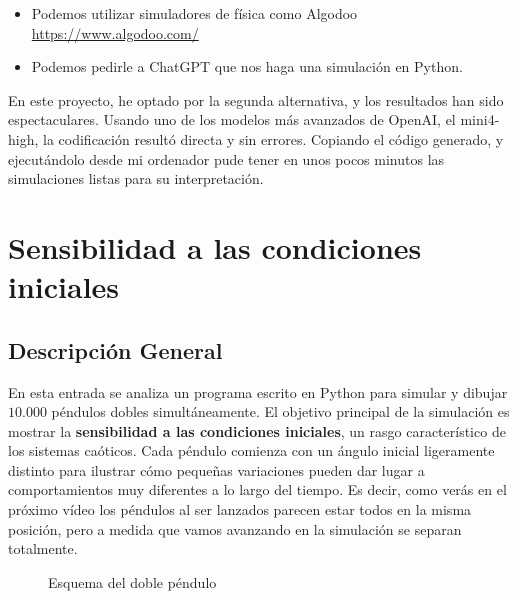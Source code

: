 \documentclass[
  10pt,
  a4paper,
  DIV=11,
  numbers=noendperiod,
  open=any]{scrreprt}
\providecommand{\tightlist}{%
  \setlength{\itemsep}{0pt}\setlength{\parskip}{0pt}}
\numberwithin{equation}{chapter}
\numberwithin{equation}{section}
\renewcommand{\[}{\begin{equation}}
\renewcommand{\]}{\end{equation}}
\begin{document}
\begin{itemize}
\tightlist
\item
  Podemos utilizar simuladores de física como Algodoo
  \url{https://www.algodoo.com/}
\item
  Podemos pedirle a ChatGPT que nos haga una simulación en Python.
\end{itemize}

En este proyecto, he optado por la segunda alternativa, y los resultados
han sido espectaculares. Usando uno de los modelos más avanzados de
OpenAI, el mini4-high, la codificación resultó directa y sin errores.
Copiando el código generado, y ejecutándolo desde mi ordenador pude
tener en unos pocos minutos las simulaciones listas para su interpretación.  

\chapter{Sensibilidad a las condiciones
iniciales}\label{sensibilidad-a-las-condiciones-iniciales}


\section{Descripción General}\label{descripciuxf3n-general}

En esta entrada se analiza un programa escrito en Python para simular y
dibujar \(10.000\) péndulos dobles simultáneamente. El objetivo
principal de la simulación es mostrar la \textbf{sensibilidad a las
condiciones iniciales}, un rasgo característico de los sistemas
caóticos. Cada péndulo comienza con un ángulo inicial ligeramente
distinto para ilustrar cómo pequeñas variaciones pueden dar lugar a
comportamientos muy diferentes a lo largo del tiempo. Es decir, como
verás en el próximo vídeo los péndulos al ser lanzados parecen estar
todos en la misma posición, pero a medida que vamos avanzando en la
simulación se separan totalmente.

\begin{figure}[h]
  \centering
  \caption{Esquema del doble péndulo}
\end{figure}
\end{document}

